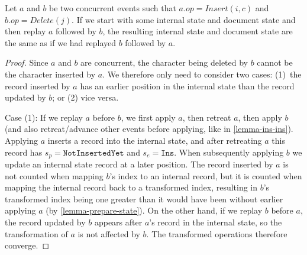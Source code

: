 \documentclass[sigplan,10pt]{acmart}
\begin{document}
\begin{lemma}\label{lemma-ins-del}
  Let $a$ and $b$ be two concurrent events such that $a.\mathit{op} = \mathit{Insert}(i, c)$ and $b.\mathit{op} = \mathit{Delete}(j)$.
  If we start with some internal state and document state and then replay $a$ followed by $b$, the resulting internal state and document state are the same as if we had replayed $b$ followed by $a$.
\end{lemma}
\begin{proof}
  Since $a$ and $b$ are concurrent, the character being deleted by $b$ cannot be the character inserted by $a$.
  We therefore only need to consider two cases: (1)~the record inserted by $a$ has an earlier position in the internal state than the record updated by $b$; or (2) vice versa.

  Case (1): If we replay $a$ before $b$, we first apply $a$, then retreat $a$, then apply $b$ (and also retreat/advance other events before applying, like in \autoref{lemma-ins-ins}).
  Applying $a$ inserts a record into the internal state, and after retreating $a$ this record has $s_p = \texttt{NotInsertedYet}$ and $s_e = \texttt{Ins}$.
  When subsequently applying $b$ we update an internal state record at a later position.
  The record inserted by $a$ is not counted when mapping $b$'s index to an internal record, but it is counted when mapping the internal record back to a transformed index, resulting in $b$'s transformed index being one greater than it would have been without earlier applying $a$ (by \autoref{lemma-prepare-state}).
  On the other hand, if we replay $b$ before $a$, the record updated by $b$ appears after $a$'s record in the internal state, so the transformation of $a$ is not affected by $b$.
  The transformed operations therefore converge.


\end{proof}
\end{document}
